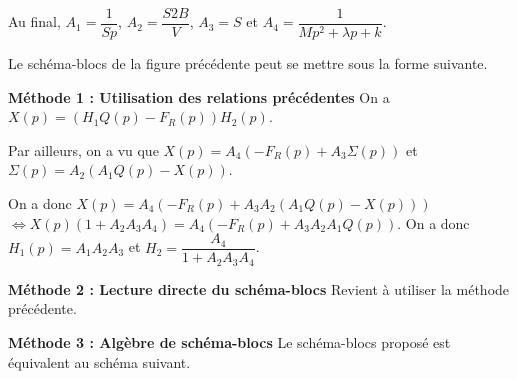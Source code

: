 Au final,  $A_1=\dfrac{1}{Sp}$,  $A_2 = \dfrac{S2B}{V} $,  $A_3 = S$  et $A_4 = \dfrac{1}{Mp^2  +\lambda p  + k}$.

\else
\fi

\ifprof
\else

Le schéma-blocs de la figure précédente peut se mettre sous la forme suivante. 

\footnotesize
\begin{center}
\end{center}
\normalsize

\fi

\ifprof

\textbf{Méthode 1 : Utilisation des relations précédentes}
On a $X(p)=\left(H_1Q(p)-F_R(p)\right)H_2(p)$. 

Par ailleurs, on a vu que $X(p)=A_4\left(-F_R(p)+A_3\Sigma(p)\right) $ et $\Sigma(p)=A_2\left(A_1Q(p)-X(p)\right)$. 

On a donc $X(p)=A_4\left(-F_R(p)+A_3  A_2\left(A_1Q(p)-X(p)\right)\right) $ $ \Leftrightarrow X(p)\left(1+A_2A_3A_4 \right)=A_4\left(-F_R(p)+A_3  A_2A_1Q(p)\right) $. On a donc 
$H_1(p)=A_1  A_2A_3$ et $H_2 = \dfrac{A_4}{1+ A_2A_3A_4 }$.

\textbf{Méthode 2 : Lecture directe du schéma-blocs}
Revient à utiliser la méthode précédente. 

\textbf{Méthode 3 : Algèbre de schéma-blocs}
Le schéma-blocs proposé est équivalent au schéma suivant. 

